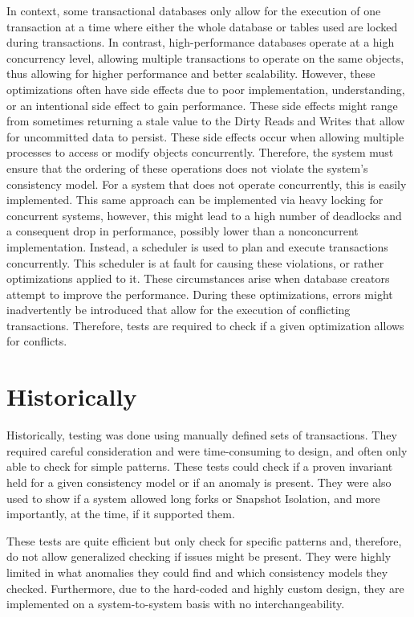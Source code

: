 \documentclass[a4paper,10pt,titlepage]{report}
\begin{document}
In context, some transactional databases only allow for the execution of one transaction at a time where either the whole database or tables used are locked during transactions. In contrast, high-performance databases operate at a high concurrency level, allowing multiple transactions to operate on the same objects, thus allowing for higher performance and better scalability. However, these optimizations often have side effects due to poor implementation, understanding, or an intentional side effect to gain performance. These side effects might range from sometimes returning a stale value to the Dirty Reads and Writes that allow for uncommitted data to persist. These side effects occur when allowing multiple processes to access or modify objects concurrently. Therefore, the system must ensure that the ordering of these operations does not violate the system's consistency model. For a system that does not operate concurrently, this is easily implemented. This same approach can be implemented via heavy locking for concurrent systems, however, this might lead to a high number of deadlocks and a consequent drop in performance, possibly lower than a nonconcurrent implementation. Instead, a scheduler is used to plan and execute transactions concurrently. This scheduler is at fault for causing these violations, or rather optimizations applied to it. 
These circumstances arise when database creators attempt to improve the performance. During these optimizations, errors might inadvertently be introduced that allow for the execution of conflicting transactions. Therefore, tests are required to check if a given optimization allows for conflicts.

\section{Historically}

Historically, testing was done using manually defined sets of transactions. They required careful consideration and were time-consuming to design, and often only able to check for simple patterns. These tests could check if a proven invariant held for a given consistency model or if an anomaly is present. They were also used to show if a system allowed long forks or Snapshot Isolation, and more importantly, at the time, if it supported them.

These tests are quite efficient but only check for specific patterns and, therefore, do not allow generalized checking if issues might be present. They were highly limited in what anomalies they could find and which consistency models they checked. Furthermore, due to the hard-coded and highly custom design, they are implemented on a system-to-system basis with no interchangeability.
\end{document}
